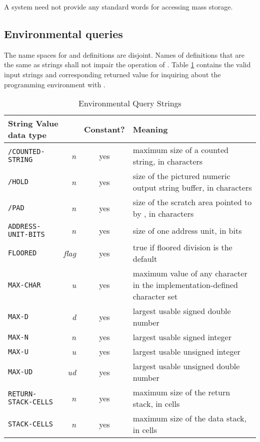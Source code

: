 A system need not provide any standard words for accessing mass
storage.

\subsection{Environmental queries} %
\label{usage:env}

The name spaces for  and definitions are
disjoint. Names of definitions that are the same as
 strings shall not impair the operation of
. Table \ref{table:env} contains
the valid input strings and corresponding returned value for
inquiring about the programming environment with
.

\begin{table}[ht]
  \begin{center}
	\caption{Environmental Query Strings}
	\label{table:env}
	\begin{tabular}{p{11em}rcp{}}
		\hline\hline
		\multicolumn{2}{l}{String \hfill Value data type} & Constant? & Meaning \\
		\hline
		\texttt{/COUNTED-STRING}	& \emph{n}		& yes
				& maximum size of a counted string, in characters \\
		\texttt{/HOLD}					& \emph{n}		& yes
				& size of the pictured numeric output string buffer,
				  in characters \\
		\texttt{/PAD}					& \emph{n}		& yes
				& size of the scratch area pointed to by \word{PAD},
				  in characters \\
		\texttt{ADDRESS-UNIT-BITS}	& \emph{n}		& yes
				& size of one address unit, in bits \\
		\texttt{FLOORED}				& \emph{flag}	& yes
				& 	true if floored division is the default \\
		\texttt{MAX-CHAR}				& \emph{u}		& yes
				& maximum value of any character in the
				  implementation-defined character set \\
		\texttt{MAX-D}					& \emph{d}		& yes
				& largest usable signed double number \\
		\texttt{MAX-N}					& \emph{n}		& yes
				& largest usable signed integer \\
		\texttt{MAX-U}					& \emph{u}		& yes
				& largest usable unsigned integer \\
		\texttt{MAX-UD}				& \emph{ud}		& yes
				& largest usable unsigned double number \\
		\texttt{RETURN-STACK-CELLS}	& \emph{n}		& yes
				& maximum size of the return stack, in cells \\
		\texttt{STACK-CELLS}			& \emph{n}		& yes
				& maximum size of the data stack, in cells \\
		\hline\hline
	\end{tabular}
  \end{center}
\end{table}

